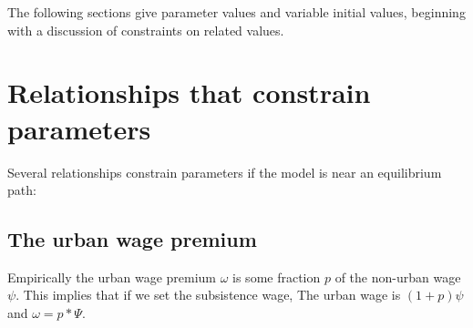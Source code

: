 






The following sections give parameter values and variable initial values, beginning with a discussion of constraints on related values. %


\section{Relationships that constrain parameters }

Several relationships constrain parameters if the model is near an equilibrium path: 

\subsection{The urban wage premium}

Empirically the urban wage premium $\omega$ is some fraction $p$ of the non-urban wage $\psi$.   This implies that if we set the subsistence wage, The urban wage is $(1+p)\psi$ and $\omega= p*\Psi$.


